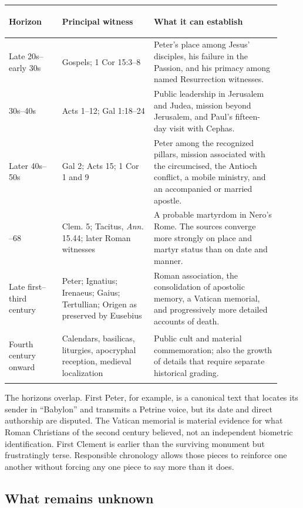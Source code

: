 \begin{longtable}{>{\bfseries\raggedright\arraybackslash}p{0.18\linewidth}
                  >{\raggedright\arraybackslash}p{0.31\linewidth}
                  >{\raggedright\arraybackslash}p{0.43\linewidth}}
\toprule
\textbf{Horizon} & \textbf{Principal witness} & \textbf{What it can establish}\\
\midrule
\endhead
Late 20s--early 30s & Gospels; 1 Cor 15:3--8 & Peter's place among Jesus' disciples, his failure in the Passion, and his primacy among named Resurrection witnesses.\\
30s--40s & Acts 1--12; Gal 1:18--24 & Public leadership in Jerusalem and Judea, mission beyond Jerusalem, and Paul's fifteen-day visit with Cephas.\\
Later 40s--50s & Gal 2; Acts 15; 1 Cor 1 and 9 & Peter among the recognized pillars, mission associated with the circumcised, the Antioch conflict, a mobile ministry, and an accompanied or married apostle.\\
64--68 & 1 Clem. 5; Tacitus, \emph{Ann.} 15.44; later Roman witnesses & A probable martyrdom in Nero's Rome. The sources converge more strongly on place and martyr status than on date and manner.\\
Late first--third century & 1 Peter; Ignatius; Irenaeus; Gaius; Tertullian; Origen as preserved by Eusebius & Roman association, the consolidation of apostolic memory, a Vatican memorial, and progressively more detailed accounts of death.\\
Fourth century onward & Calendars, basilicas, liturgies, apocryphal reception, medieval localization & Public cult and material commemoration; also the growth of details that require separate historical grading.\\
\bottomrule
\end{longtable}

The horizons overlap. First Peter, for example, is a canonical text that
locates its sender in ``Babylon'' and transmits a Petrine voice, but its date
and direct authorship are disputed. The Vatican memorial is material evidence
for what Roman Christians of the second century believed, not an independent
biometric identification. First Clement is earlier than the surviving
monument but frustratingly terse. Responsible chronology allows those pieces
to reinforce one another without forcing any one piece to say more than it
does.

\subsection{What remains unknown}

